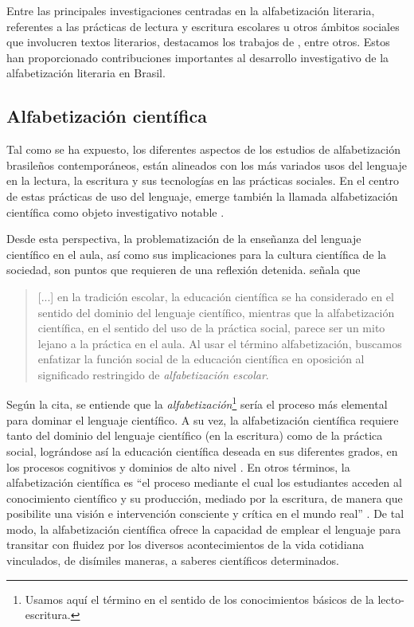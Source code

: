 \documentclass{textolivre}
\begin{document}
Entre las principales investigaciones centradas en la alfabetización literaria, referentes a las prácticas de lectura y escritura escolares u otros ámbitos sociales que involucren textos literarios, destacamos los trabajos de \textcite{lajolo_leitura_1991, soares_escolarizacao_1999, paulino_letramento_2001, cosson_letramento_2009}, entre otros. Estos han proporcionado contribuciones importantes al desarrollo investigativo de la alfabetización literaria en Brasil. 

\subsection{Alfabetización científica}\label{sec-cientifica}
Tal como se ha expuesto, los diferentes aspectos de los estudios de alfabetización brasileños contemporáneos, están alineados con los más variados usos del lenguaje en la lectura, la escritura y sus tecnologías en las prácticas sociales. En el centro de estas prácticas de uso del lenguaje, emerge también la llamada alfabetización científica como objeto investigativo notable \cite{santos_educacao_2007, cunha_alfabetizacao_2017}.   

Desde esta perspectiva, la problematización de la enseñanza del lenguaje científico en el aula, así como sus implicaciones para la cultura científica de la sociedad, son puntos que requieren de una reflexión detenida. \textcite[p. 479]{santos_educacao_2007} señala que

\begin{quote}
    [...] en la tradición escolar, la educación científica se ha considerado en el sentido del dominio del lenguaje científico, mientras que la alfabetización científica, en el sentido del uso de la práctica social, parece ser un mito lejano a la práctica en el aula. Al usar el término alfabetización, buscamos enfatizar la función social de la educación científica en oposición al significado restringido de \textit{alfabetización escolar}. 
\end{quote}

Según la cita, se entiende que la \textit{alfabetización}\footnote{Usamos aquí el término en el sentido de los conocimientos básicos de la lecto-escritura.} sería el proceso más elemental para dominar el lenguaje científico. A su vez, la alfabetización científica requiere tanto del dominio del lenguaje científico (en la escritura) como de la práctica social, lográndose así la educación científica deseada en sus diferentes grados, en los procesos cognitivos y dominios de alto nivel \cite{santos_educacao_2007}. En otros términos, la alfabetización científica es “el proceso mediante el cual los estudiantes acceden al conocimiento científico y su producción, mediado por la escritura, de manera que posibilite una visión e intervención consciente y crítica en el mundo real” \cite[p. 7]{silva_ciencia_2018}. De tal modo, la alfabetización científica ofrece la capacidad de emplear el lenguaje para transitar con fluidez por los diversos acontecimientos de la vida cotidiana vinculados, de disímiles maneras, a saberes científicos determinados.
\end{document}
